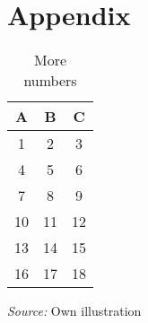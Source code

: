\chapter*{Appendix}

\begin{table}[H]
    \centering
    \captionsetup{font=bf}
    \caption{More numbers} %
    \begin{tabular}{|c|c|c|} %
        \hline
        \textbf{A} & \textbf{B} & \textbf{C} \\ %
        \hline
        1 & 2 & 3 \\ %
        \hline
        4 & 5 & 6 \\ %
        \hline
        7 & 8 & 9 \\ %
        \hline
        10 & 11 & 12 \\ %
        \hline
        13 & 14 & 15 \\ %
        \hline
        16 & 17 & 18 \\ %
        \hline
    \end{tabular}
    \label{tab:secondtable}
    \begin{tablenotes}
        \centering
        \item \textit{Source:} Own illustration %
    \end{tablenotes}
\end{table}